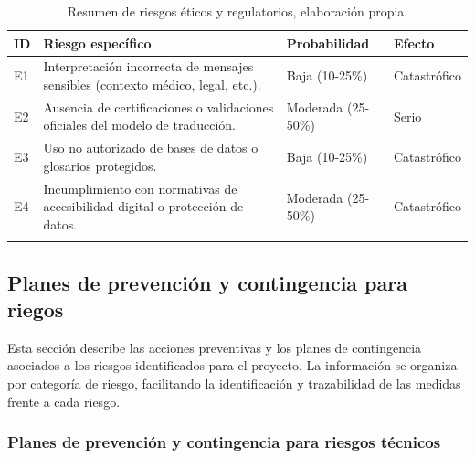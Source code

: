 \begin{longtable}{|>{\centering\arraybackslash}p{0.8cm}|>{\raggedright\arraybackslash}p{3.5cm}|>{\raggedright\arraybackslash}p{5.1cm}|>{\raggedright\arraybackslash}p{5.1cm}|}
	\hline
	\textbf{ID} & \textbf{Riesgo específico} & \textbf{Probabilidad} & \textbf{Efecto} \\
	\hline
	E1 & Interpretación incorrecta de mensajes sensibles (contexto médico, legal, etc.). & Baja (10-25\%) & Catastrófico \\
	\hline
	E2 & Ausencia de certificaciones o validaciones oficiales del modelo de traducción. & Moderada (25-50\%) & Serio \\
	\hline
	E3 & Uso no autorizado de bases de datos o glosarios protegidos. & Baja (10-25\%) & Catastrófico \\
	\hline
	E4 & Incumplimiento con normativas de accesibilidad digital o protección de datos. & Moderada (25-50\%) & Catastrófico \\
	\hline
\caption[Resumen de riesgos éticos y regulatorios]{Resumen de riesgos éticos y regulatorios, elaboración propia.} \label{tab:riesgos_eticos_resumen} \\
\end{longtable}

\newpage
\subsection{Planes de prevención y contingencia para riegos}

Esta sección describe las acciones preventivas y los planes de contingencia asociados a los riesgos identificados para el proyecto. La información se organiza por categoría de riesgo, facilitando la identificación y trazabilidad de las medidas frente a cada riesgo.

\subsubsection{Planes de prevención y contingencia para riesgos técnicos}

\setlength{\tabcolsep}{4pt}
\renewcommand{\arraystretch}{1.2}

